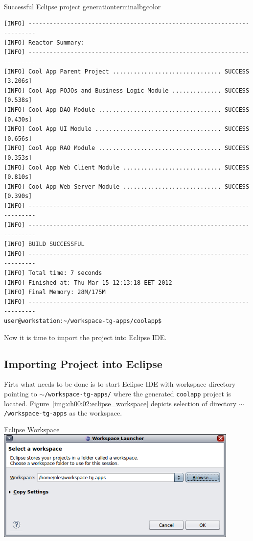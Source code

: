   \begin{code}{Successful Eclipse project generation}{\label{lst:mvn_eclipse_eclipse_completed}}{terminalbgcolor}
      \begin{lstlisting}
[INFO] ------------------------------------------------------------------------
[INFO] Reactor Summary:
[INFO] ------------------------------------------------------------------------
[INFO] Cool App Parent Project ............................... SUCCESS [3.206s]
[INFO] Cool App POJOs and Business Logic Module .............. SUCCESS [0.538s]
[INFO] Cool App DAO Module ................................... SUCCESS [0.430s]
[INFO] Cool App UI Module .................................... SUCCESS [0.656s]
[INFO] Cool App RAO Module ................................... SUCCESS [0.353s]
[INFO] Cool App Web Client Module ............................ SUCCESS [0.810s]
[INFO] Cool App Web Server Module ............................ SUCCESS [0.390s]
[INFO] ------------------------------------------------------------------------
[INFO] ------------------------------------------------------------------------
[INFO] BUILD SUCCESSFUL
[INFO] ------------------------------------------------------------------------
[INFO] Total time: 7 seconds
[INFO] Finished at: Thu Mar 15 12:13:18 EET 2012
[INFO] Final Memory: 28M/175M
[INFO] ------------------------------------------------------------------------
user@workstation:~/workspace-tg-apps/coolapp$ 
      \end{lstlisting}
  \end{code}

  Now it is time to import the project into Eclipse IDE.

\subsection{Importing Project into Eclipse}

  Firts what needs to be done is to start Eclipse IDE with workspace directory pointing to \texttt{$\sim$/workspace-tg-apps/} where the generated \texttt{coolapp} project is located.
  Figure~\ref{img:ch00:02:eclipse_workspace} depicts selection of directory \texttt{$\sim$/workspace-tg-apps} as the workspace.  

  \begin{image}{Eclipse Workspace}{\label{img:ch00:02:eclipse_workspace}}    
    \includegraphics[width=0.9\textwidth]{parts/00-part/chapters/01-application-modules/images/07-eclipse-workspace.png}
  \end{image}

